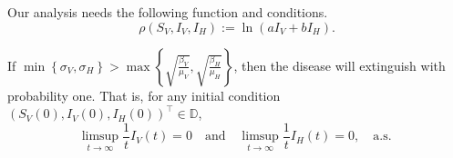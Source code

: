 Our analysis needs the following function and conditions.
\begin{equation}
    \rho (S_V, I_V, I_H) := \ln (a I_V + b I_H) .
\end{equation}

\begin{theorem}
        If 
        $
            \displaystyle
            \min
                \left \{
                      \sigma_V, \sigma_H 
                \right\} 
                > 
            \max 
                \left \{
                    \sqrt{\frac{\beta_V}{\mu_V}},
                    \sqrt{\frac{\beta_H}{\mu_H}}
                \right \}
        $,
        then the disease will extinguish with probability one.  That is,
        for any initial condition 
        $(S_V(0), I_V(0), I_H(0)) ^{\top} \in \mathbb{D}$,
        $$
            \limsup_{t \to \infty} 
                \frac{1}{t} I_V(t) = 0 
                \quad \text{and} \quad
            \limsup_{t \to \infty} 
                \frac{1}{t} I_H(t) = 0, \quad 
                \text{
                   a.s.
                }
        $$
\end{theorem}        
